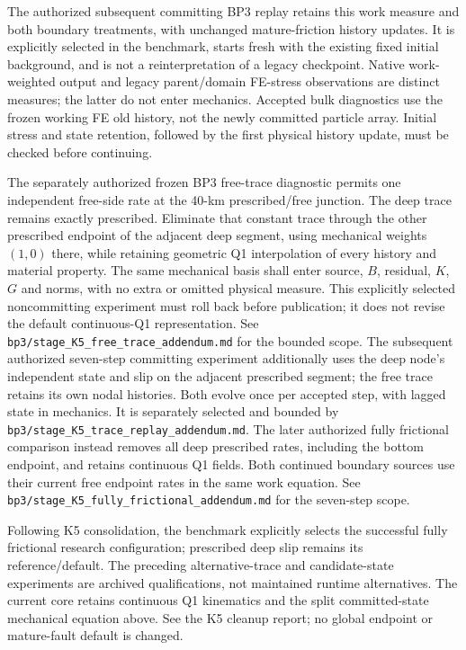 \documentclass[11pt]{article}
\begin{document}
The authorized subsequent committing BP3 replay retains this work measure
and both boundary treatments, with unchanged mature-friction history updates.
It is explicitly selected in the benchmark, starts fresh with the existing
fixed initial background, and is not a reinterpretation of a legacy
checkpoint. Native work-weighted output and legacy parent/domain FE-stress
observations are distinct measures; the latter do not enter mechanics.
Accepted bulk diagnostics use the frozen working FE old history, not the
newly committed particle array. Initial stress and state retention, followed
by the first physical history update, must be checked before continuing.

The separately authorized frozen BP3 free-trace diagnostic permits one
independent free-side rate at the 40-km prescribed/free junction. The deep
trace remains exactly prescribed. Eliminate that constant trace through the
other prescribed endpoint of the adjacent deep segment, using mechanical
weights $(1,0)$ there, while retaining geometric Q1 interpolation of every
history and material property. The same mechanical basis shall enter source,
$B$, residual, $K$, $G$ and norms, with no extra or omitted physical measure.
This explicitly selected noncommitting experiment must roll back before
publication; it does not revise the default continuous-Q1 representation.
See \texttt{bp3/stage\_K5\_free\_trace\_addendum.md} for the bounded scope.
The subsequent authorized seven-step committing experiment additionally uses
the deep node's independent state and slip on the adjacent prescribed segment;
the free trace retains its own nodal histories. Both evolve once per accepted
step, with lagged state in mechanics. It is separately selected and bounded by
\texttt{bp3/stage\_K5\_trace\_replay\_addendum.md}.
The later authorized fully frictional comparison instead removes all deep
prescribed rates, including the bottom endpoint, and retains continuous Q1
fields. Both continued boundary sources use their current free endpoint
rates in the same work equation. See
\texttt{bp3/stage\_K5\_fully\_frictional\_addendum.md} for the seven-step scope.

Following K5 consolidation, the benchmark explicitly selects the successful
fully frictional research configuration; prescribed deep slip remains its
reference/default. The preceding alternative-trace and candidate-state
experiments are archived qualifications, not maintained runtime alternatives.
The current core retains continuous Q1 kinematics and the split committed-state
mechanical equation above. See the K5 cleanup report; no global endpoint or
mature-fault default is changed.
\end{document}
